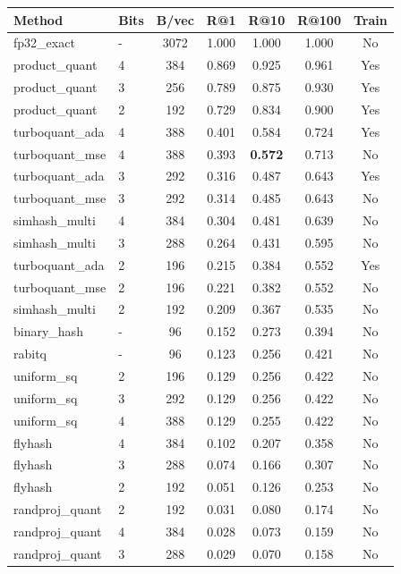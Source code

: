 \begin{tabular}{llccccc}
\toprule
Method & Bits & B/vec & R@1 & R@10 & R@100 & Train \\
\midrule
fp32\_exact & - & 3072 & 1.000 & 1.000 & 1.000 & No \\
product\_quant & 4 & 384 & 0.869 & 0.925 & 0.961 & Yes \\
product\_quant & 3 & 256 & 0.789 & 0.875 & 0.930 & Yes \\
product\_quant & 2 & 192 & 0.729 & 0.834 & 0.900 & Yes \\
turboquant\_ada & 4 & 388 & 0.401 & 0.584 & 0.724 & Yes \\
turboquant\_mse & 4 & 388 & 0.393 & \textbf{0.572} & 0.713 & No \\
turboquant\_ada & 3 & 292 & 0.316 & 0.487 & 0.643 & Yes \\
turboquant\_mse & 3 & 292 & 0.314 & 0.485 & 0.643 & No \\
simhash\_multi & 4 & 384 & 0.304 & 0.481 & 0.639 & No \\
simhash\_multi & 3 & 288 & 0.264 & 0.431 & 0.595 & No \\
turboquant\_ada & 2 & 196 & 0.215 & 0.384 & 0.552 & Yes \\
turboquant\_mse & 2 & 196 & 0.221 & 0.382 & 0.552 & No \\
simhash\_multi & 2 & 192 & 0.209 & 0.367 & 0.535 & No \\
binary\_hash & - & 96 & 0.152 & 0.273 & 0.394 & No \\
rabitq & - & 96 & 0.123 & 0.256 & 0.421 & No \\
uniform\_sq & 2 & 196 & 0.129 & 0.256 & 0.422 & No \\
uniform\_sq & 3 & 292 & 0.129 & 0.256 & 0.422 & No \\
uniform\_sq & 4 & 388 & 0.129 & 0.255 & 0.422 & No \\
flyhash & 4 & 384 & 0.102 & 0.207 & 0.358 & No \\
flyhash & 3 & 288 & 0.074 & 0.166 & 0.307 & No \\
flyhash & 2 & 192 & 0.051 & 0.126 & 0.253 & No \\
randproj\_quant & 2 & 192 & 0.031 & 0.080 & 0.174 & No \\
randproj\_quant & 4 & 384 & 0.028 & 0.073 & 0.159 & No \\
randproj\_quant & 3 & 288 & 0.029 & 0.070 & 0.158 & No \\
\bottomrule
\end{tabular}

